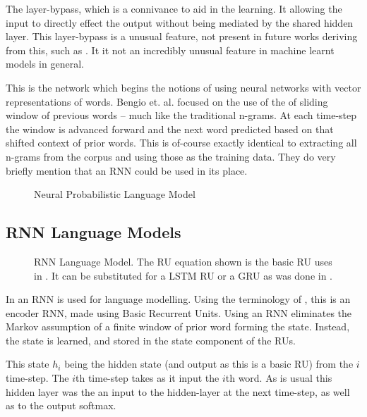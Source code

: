 \documentclass[parskip]{komatufte}
\begin{document}
The layer-bypass, which is a connivance to aid in the learning.
It allowing the input to directly effect the output without being mediated by the shared hidden layer.
This layer-bypass is a unusual feature, not present in future works deriving from this, such as .
It it not an incredibly unusual feature in machine learnt models in general.

This is the network which begins the notions of using neural networks with vector representations of words.
Bengio et. al. focused on the use of the of sliding window of previous words -- much like the traditional n-grams.
At each time-step the window is advanced forward and the next word predicted based on that shifted context of prior words.
This is of-course exactly identical to extracting all n-grams from the corpus and using those as the training data.
They do very briefly mention that an RNN could be used in its place.

\begin{figure}
	\caption{\label{fig:neural-language-model} Neural Probabilistic Language Model}
	\centering
	 
\end{figure}


\subsection{RNN Language Models}
\begin{figure}
	\caption{\label{fig:neural-language-model} RNN Language Model. The RU equation shown is the basic RU uses in \textcite{mikolov2010recurrent}.
	It can be substituted for a LSTM RU or a GRU as was done in \textcite{sundermeyer2012lstm,jozefowicz2015empirical}.
	}
	\centering
	\resizebox{\textwidth}{!}{}
\end{figure}


In  an RNN is used for language modelling.
Using the terminology of , this is an encoder RNN, made using Basic Recurrent Units.
Using an RNN eliminates the Markov assumption of a finite window of prior word forming the state.
Instead, the state is learned, and stored in the state component of the RUs. 


This state $h_{i}$ being the hidden state  (and output as this is a basic RU) from the $i$ time-step.
The $i$th time-step takes as it input the $i$th word.
As is usual this hidden layer was the an input to the hidden-layer at the next time-step, as well as to the output softmax.
\end{document}
